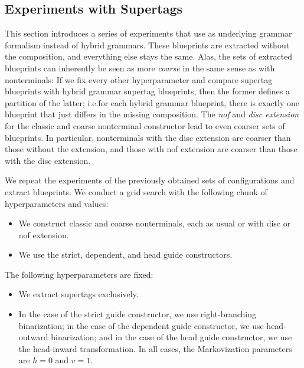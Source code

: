 \documentclass[../../document.tex]{subfiles}
\begin{document}
    \subsection{Experiments with  Supertags}\label{sec:gridsearch:dcp}
    This section introduces a series of experiments that use  as underlying grammar formalism instead of hybrid grammars.
    These blueprints are extracted without the  composition, and everything else stays the same.
    Alas, the sets of extracted blueprints can inherently be seen as more \emph{coarse} in the same sense as with nonterminals:
        If we fix every other hyperparameter and compare  supertag blueprints with hybrid grammar supertag blueprints, then the former defines a partition of the latter; i.e.\@ for each hybrid grammar blueprint, there is exactly one  blueprint that just differs in the missing composition.
    The \emph{nof} and \emph{disc extension} for the classic and coarse nonterminal constructor lead to even coarser sets of blueprints.
    In particular, nonterminals with the disc extension are coarser than those without the extension, and those with nof extension are coarser than those with the disc extension.

    We repeat the experiments of the previously obtained sets of configurations and extract  blueprints.
    We conduct a grid search with the following chunk of hyperparameters and values:
    \begin{itemize}
        \item We construct classic and coarse nonterminals, each as usual or with disc or nof extension.
        \item We use the strict, dependent, and head guide constructors.
    \end{itemize}
    The following hyperparameters are fixed:
    \begin{itemize}
        \item We extract  supertags exclusively.
        \item In the case of the strict guide constructor, we use right-branching binarization; in the case of the dependent guide constructor, we use head-outward binarization; and in the case of the head guide constructor, we use the head-inward transformation. In all cases, the Markovization parameters are $h=0$ and $v=1$.
    \end{itemize}
\end{document}
